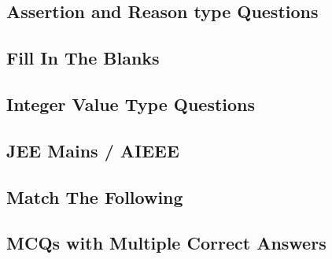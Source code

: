 \subsection*{Assertion and Reason type Questions}
\begin{enumerate}[label=\thesubsection.\arabic*,ref=\thesubsection.\theenumi]




\end{enumerate}
\subsection*{Fill In The Blanks}
\begin{enumerate}[label=\thesubsection.\arabic*,ref=\thesubsection.\theenumi]




\end{enumerate}
\subsection*{Integer Value Type Questions}
\begin{enumerate}[label=\thesubsection.\arabic*,ref=\thesubsection.\theenumi]




\end{enumerate}
\subsection*{JEE Mains / AIEEE}
\begin{enumerate}[label=\thesubsection.\arabic*,ref=\thesubsection.\theenumi]





\end{enumerate}
\subsection*{Match The Following}
\begin{enumerate}[label=\thesubsection.\arabic*,ref=\thesubsection.\theenumi]




\end{enumerate}
\subsection*{MCQs with Multiple Correct Answers}
\begin{enumerate}[label=\thesubsection.\arabic*,ref=\thesubsection.\theenumi]





\end{enumerate}
